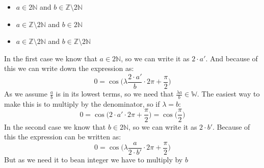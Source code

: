 \documentclass[12pt, a4paper]{article}
\begin{document}
\begin{itemize}
 \item $a \in 2\mathbb{N}$ and $b \in \mathbb{Z}\setminus2\mathbb{N}$
 \item $a \in \mathbb{Z} \setminus2\mathbb{N}$ and $b \in 2\mathbb{N}$
 \item $a \in\mathbb{Z}\setminus2\mathbb{N}$ and $b \in \mathbb{Z}\setminus2\mathbb{N}$
\end{itemize}
In the first case we know that $a \in 2\mathbb{N}$, so we can write it as $2\cdot a'$. And because of this we can write down the expression as:
\begin{equation}
 0 = \cos\Bigr(\lambda\frac{2\cdot a'}{b} \cdot 2\pi + \frac{\pi}{2}\Bigr)
\end{equation}
As we assume $\frac{a}{b}$ is in its lowest terms, so we need that $\frac{\lambda a}{b} \in \mathbb{W}$. The easiest way to make this is to multiply by the denominator, so if $\lambda = b$:
\begin{equation}
 0 = \cos\Bigr(2\cdot a'\cdot2\pi + \frac{\pi}{2}\Bigr) = \cos\Bigr(\frac{\pi}{2}\Bigr)
\end{equation}
In the second case we know that $b \in 2\mathbb{N}$, so we can write it as $2\cdot b'$. Because of this the expression can be written as:
\begin{equation}
 0 = \cos\Bigr(\lambda\frac{a}{2\cdot b'}\cdot{2\pi}+\frac{\pi}{2}\Bigr)
\end{equation}
But as we need it to bean integer we have to multiply by $b$
\end{document}
